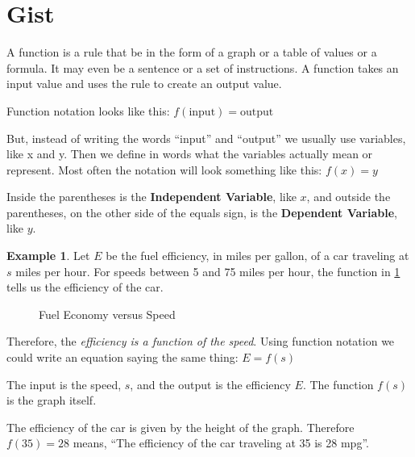 \documentclass[10pt,]{book}
\newcommand{\terminology}[1]{\textbf{#1}}
\theoremstyle{plain}
\theoremstyle{definition}
\newtheorem{example}[theorem]{Example}
\begin{document}
\section[Gist]{Gist}\label{functions-gist}
A function is a rule that be in the form of a graph or a table of values or a formula.  It may even be a sentence or a set of instructions.  A function takes an input value and uses the rule to create an output value.%
\par
Function notation looks like this: \(f(\text{input})=\text{output}\)%
\par
But, instead of writing the words ``input'' and ``output'' we usually use variables, like x and y. Then we define in words what the variables actually mean or represent.  Most often the notation will look something like this: \(f(x)=y\)
%
\par
Inside the parentheses is the \terminology{Independent Variable}, like \(x\), and outside the parentheses, on the other side of the equals sign, is the \terminology{Dependent Variable}, like \(y\).%
\begin{example}\label{example-1}
Let \(E\) be the fuel efficiency, in miles per gallon, of a car traveling at \(s\) miles per hour. For speeds between 5 and 75 miles per hour, the function in \hyperref[speed-vs-efficiency]{\ref{speed-vs-efficiency}} tells us the efficiency of the car.%
\leavevmode%
\begin{figure}
\centering
{
}
\caption{Fuel Economy versus Speed\label{speed-vs-efficiency}}
\end{figure}
\par
Therefore, the \emph{efficiency is a function of the speed}. Using function notation we could write an equation saying the same thing: \(E=f(s)\)%
\par
The input is the speed, \(s\), and the output is the efficiency \(E\). The function \(f(s)\) is the graph itself.%
\par
The efficiency of the car is given by the height of the graph.  Therefore \(f(35) = 28\) means, ``The efficiency of the car traveling at \SI{35}{\mileperhour} is 28 mpg''.%
\end{example}
\typeout{************************************************}
\typeout{************************************************}
\end{document}
